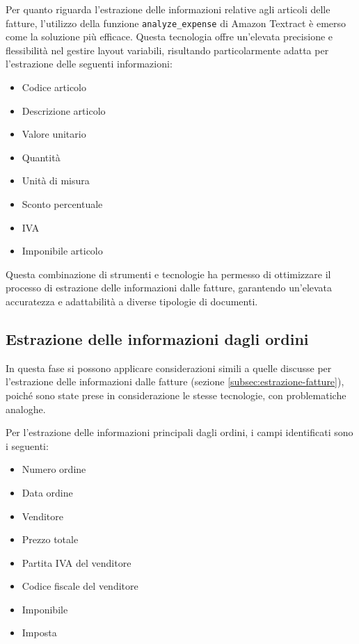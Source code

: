Per quanto riguarda l'estrazione delle informazioni relative agli articoli delle fatture, l'utilizzo della funzione \texttt{analyze\_expense} di Amazon Textract è emerso come la soluzione più efficace. Questa tecnologia offre un'elevata precisione e flessibilità nel gestire layout variabili, risultando particolarmente adatta per l'estrazione delle seguenti informazioni:

\begin{itemize}
    \item Codice articolo
    \item Descrizione articolo
    \item Valore unitario
    \item Quantità
    \item Unità di misura
    \item Sconto percentuale
    \item IVA
    \item Imponibile articolo
\end{itemize}

Questa combinazione di strumenti e tecnologie ha permesso di ottimizzare il processo di estrazione delle informazioni dalle fatture, garantendo un'elevata accuratezza e adattabilità a diverse tipologie di documenti.


\subsection{Estrazione delle informazioni dagli ordini}
In questa fase si possono applicare considerazioni simili a quelle discusse per l'estrazione delle informazioni dalle fatture (sezione \ref{subsec:estrazione-fatture}), poiché sono state prese in considerazione le stesse tecnologie, con problematiche analoghe.

Per l'estrazione delle informazioni principali dagli ordini, i campi identificati sono i seguenti:

\begin{itemize}
    \item Numero ordine
    \item Data ordine
    \item Venditore
    \item Prezzo totale
    \item Partita IVA del venditore
    \item Codice fiscale del venditore
    \item Imponibile
    \item Imposta
\end{itemize}

